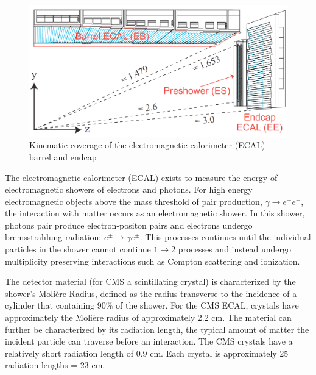 \begin{figure}
\begin{center}
\includegraphics[width=.95\textwidth]{pics/ecal_diagram_side}
\end{center}
\caption{Kinematic coverage of the electromagnetic calorimeter (ECAL) barrel and endcap}
\label{fig:ecal}
\end{figure}

The electromagnetic calorimeter (ECAL) exists to measure the energy of electromagnetic
showers of electrons and photons. For high energy electromagnetic objects  above the mass threshold of 
pair production, $\gamma \rightarrow e^+e^-$, the interaction with matter occurs as an electromagnetic shower.
 In this shower, photons pair produce electron-positon pairs and
electrons undergo bremsstrahlung radiation: $e^\pm \rightarrow \gamma e^\pm$. This processes continues until 
the individual particles in the shower cannot continue $1\rightarrow 2$
 processes and instead undergo multiplicity preserving interactions such 
as Compton scattering and ionization.

The detector material (for CMS a scintillating crystal) is characterized by the shower's
 Moli\`ere Radius, defined as the radius
 transverse to the incidence of a cylinder that containing 90\% of the shower. For the CMS ECAL, 
crystals have approximately the Moli\`ere radius of approximately 2.2 cm. The material can further
be characterized by its radiation length, the typical amount of matter the incident particle
can traverse before an interaction. The CMS crystals have a relatively short radiation
 length of 0.9 cm. Each crystal is approximately 25 radiation lengths = 23 cm. 

